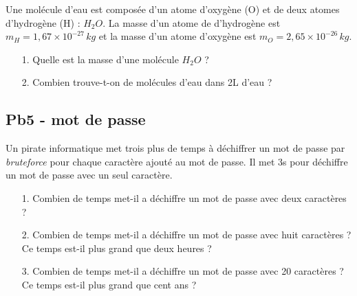 Une molécule d'eau est composée d'un atome d'oxygène (O) et de deux atomes d'hydrogène (H) : $H_{2}O$. La masse d'un atome de d'hydrogène est $m_H = 1,67\times 10^{-27} \,kg$ et la masse d'un atome d'oxygène est $ m_O = 2,65 \times 10^{-26} \,kg$. \\

\begin{itemize}
  \item[1.] Quelle est la masse d'une molécule $H_{2}O$ ? 
  \item[2.] Combien trouve-t-on de molécules d'eau dans 2L d'eau ?
\end{itemize}

\Pointilles[7]

\subsection*{Pb5 - mot de passe}

Un pirate informatique met trois plus de temps à déchiffrer un mot de passe par \textit{bruteforce} pour chaque caractère ajouté au mot de passe. Il met 3s pour déchiffre un mot de passe avec un seul caractère.  

\begin{itemize}
  \item[1.] Combien de temps met-il a déchiffre un mot de passe avec deux caractères ?
  \item[2.] Combien de temps met-il a déchiffre un mot de passe avec huit caractères ? \\
  Ce temps est-il plus grand que deux heures ?
  \item[3.] Combien de temps met-il a déchiffre un mot de passe avec 20 caractères ? \\
  Ce temps est-il plus grand que cent ans ?
\end{itemize}


\Pointilles[14]


